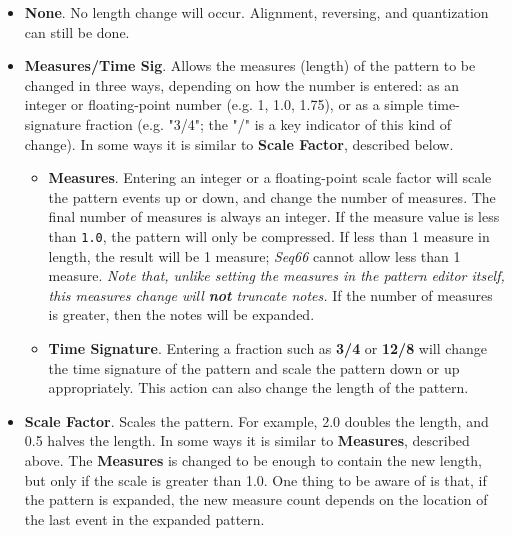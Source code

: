    \begin{itemize}
      \item \textbf{None}.
         No length change will occur.
         Alignment, reversing, and quantization can still be done.
      \item \textbf{Measures/Time Sig}.
         Allows the measures (length) of the pattern to be changed in three
         ways, depending on how the number is entered: as an integer or
         floating-point number (e.g. 1, 1.0, 1.75),
         or as a simple time-signature fraction (e.g. "3/4"; the "/" is a
         key indicator of this kind of change).
         In some ways it is similar to \textbf{Scale Factor}, described
         below.
         \begin{itemize}
            \item \textbf{Measures}.
               Entering an integer or a floating-point scale factor will scale
               the pattern events up or down,
               and change the number of measures.
               The final number of measures is always an integer.
               If the measure value is less than \texttt{1.0},
               the pattern will only be compressed.
               If less than 1 measure in length, the result will be
               1 measure; \textsl{Seq66} cannot allow less than 1 measure.
               \textsl{Note that, unlike setting the measures in the pattern
               editor itself, this measures change will \textbf{not}
               truncate notes.}
               If the number of measures is greater, then the notes will
               be expanded.
            \item \textbf{Time Signature}.
               Entering a fraction such as \textbf{3/4} or
               \textbf{12/8} will change the time signature of the pattern
               and scale the pattern down or up appropriately.
               This action can also change the length of the pattern.
         \end{itemize}
      \item \textbf{Scale Factor}.
         Scales the pattern.  For example, 2.0 doubles the length, and 0.5
         halves the length.
         In some ways it is similar to \textbf{Measures}, described
         above.
         The \textbf{Measures} is changed to be enough to contain the new length,
         but only if the scale is greater than 1.0.
         One thing to be aware of is that, if the pattern is expanded, the
         new measure count depends on the location of the last event in the
         expanded pattern.
   \end{itemize}

